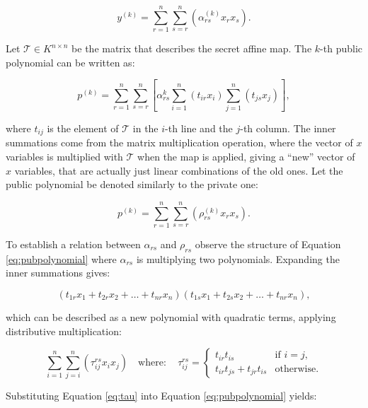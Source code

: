 \documentclass{ufsctex/ufsctex}
\begin{document}
\begin{equation}
y^{(k)} = \sum_{r=1}^n \sum_{s=r}^n\left(\alpha^{(k)}_{rs}x_rx_s\right).
\end{equation}

Let $\mathcal{T} \in K^{n \times n}$ be the matrix that describes the secret
affine map. The $k$-th public polynomial can be written as:

\begin{equation}\label{eq:pubpolynomial}
p^{(k)} = \sum_{r=1}^n \sum_{s=r}^n
\left[ \alpha^{k}_{rs} \sum_{i=1}^n(t_{ir}x_i) \sum_{j=1}^n(t_{js}x_j) \right],
\end{equation}

\noindent
where $t_{ij}$ is the element of $\mathcal{T}$ in the $i$-th line and the
$j$-th column. The inner summations come from the matrix multiplication
operation, where the vector of $x$ variables is multiplied with $\mathcal{T}$
when the map is applied, giving a ``new'' vector of $x$ variables, that are
actually just linear combinations of the old ones. Let the public polynomial be
denoted similarly to the private one:

\begin{equation}
p^{(k)} = \sum_{r=1}^n \sum_{s=r}^n \left( \rho^{(k)}_{rs}x_rx_s \right).
\end{equation}

To establish a relation between $\alpha_{rs}$ and $\rho_{rs}$
observe the structure of Equation \ref{eq:pubpolynomial} where $\alpha_{rs}$ is
multiplying two polynomials. Expanding the inner summations gives:

\begin{equation}
(t_{1r}x_1 + t_{2r}x_2 + \dots + t_{nr}x_n)
(t_{1s}x_1 + t_{2s}x_2 + \dots + t_{nr}x_n),
\end{equation}

\noindent
which can be described as a new polynomial with quadratic terms, applying
distributive multiplication:

\begin{equation}\label{eq:tau}
\sum_{i=1}^{n}\sum_{j=i}^n \left( \tau^{rs}_{ij} x_i x_j \right)
\quad \mathrm{where:} \quad \tau^{rs}_{ij} =
\begin{cases}
	t_{ir} t_{is} &\mbox{if } i=j, \\
	t_{ir} t_{js} + t_{jr} t_{is} &\mbox{otherwise.}
\end{cases}
\end{equation}

Substituting Equation \ref{eq:tau} into Equation \ref{eq:pubpolynomial} yields:
\end{document}
